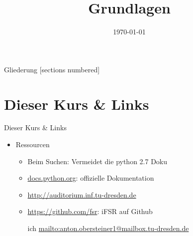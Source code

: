 



\title{Grundlagen}
\date{\today}




\maketitle

\begin{frame}{Gliederung}
	[sections numbered]
	\tableofcontents
\end{frame}

\section{Dieser Kurs \& Links}
\begin{frame}{Dieser Kurs \& Links}
	\begin{itemize}
		\item Ressourcen
		\begin{itemize}
			\item Beim Suchen: Vermeidet die python 2.7 Doku
			\item \url{docs.python.org}: offizielle Dokumentation
			\item \url{http://auditorium.inf.tu-dresden.de}
			\item \url{https://github.com/fsr}: iFSR auf Github
			\item[ich] \url{mailto:anton.obersteiner1@mailbox.tu-dresden.de}
		\end{itemize}
	\end{itemize}
\end{frame}


